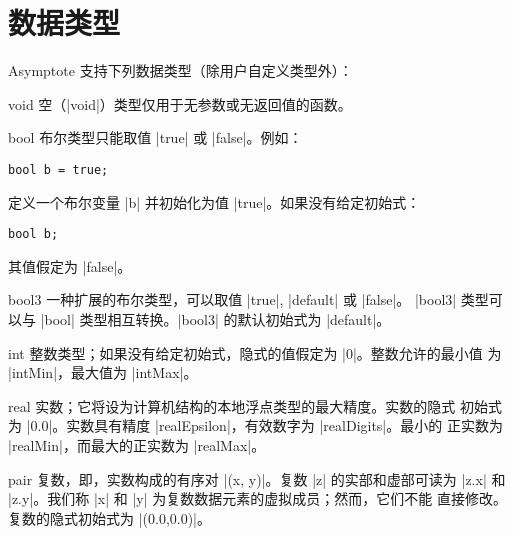 \documentclass[nofonts,CJKnormalspaces]{ctexbook}[2009/05/20]
\makeatletter
\newenvironment{typelist}{\itemize
  \let\old@item\@item
  \def\@item[##1]{\expandafter\old@item[\ttfamily\color{type!50!black}##1]}}
{\enditemize}
\newcommand*\prgname[1]{\textsf{#1}}
\makeatother
\begin{document}
\section{数据类型}

\prgname{Asymptote} 支持下列数据类型（除用户自定义类型外）：
\begin{typelist}

\item[void] 空（|void|）类型仅用于无参数或无返回值的函数。

\item[bool] 布尔类型只能取值 |true| 或 |false|。例如：
\begin{lstlisting}
bool b = true;
\end{lstlisting}
定义一个布尔变量 |b| 并初始化为值 |true|。如果没有给定初始式：
\begin{lstlisting}
bool b;
\end{lstlisting}
其值假定为 |false|。

\item[bool3] 一种扩展的布尔类型，可以取值 |true|, |default| 或 |false|。
|bool3| 类型可以与 |bool| 类型相互转换。|bool3| 的默认初始式为 |default|。

\item[int] 整数类型；如果没有给定初始式，隐式的值假定为 |0|。整数允许的最小值
为 |intMin|，最大值为 |intMax|。

\item[real] 实数；它将设为计算机结构的本地浮点类型的最大精度。实数的隐式
初始式为 |0.0|。实数具有精度 |realEpsilon|，有效数字为 |realDigits|。最小的
正实数为 |realMin|，而最大的正实数为 |realMax|。

\item[pair] 复数，即，实数构成的有序对 |(x, y)|。复数 |z| 的实部和虚部可读为
|z.x| 和 |z.y|。我们称 |x| 和 |y| 为复数数据元素的虚拟成员；然而，它们不能
直接修改。复数的隐式初始式为 |(0.0,0.0)|。


\end{typelist}
\end{document}
